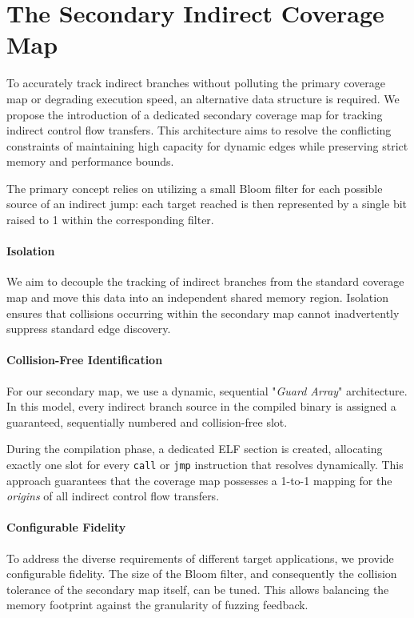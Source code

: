 \section{The Secondary Indirect Coverage Map}

To accurately track indirect branches without polluting the primary coverage map or degrading execution speed, an alternative data structure is required. We propose the introduction of a dedicated secondary coverage map for tracking indirect control flow transfers. This architecture aims to resolve the conflicting constraints of maintaining high capacity for dynamic edges while preserving strict memory and performance bounds.

The primary concept relies on utilizing a small Bloom filter for each possible source of an indirect jump: each target reached is then represented by a single bit raised to 1 within the corresponding filter. 

\paragraph{Isolation} We aim to decouple the tracking of indirect branches from the standard coverage map and move this data into an independent shared memory region. Isolation ensures that collisions occurring within the secondary map cannot inadvertently suppress standard edge discovery. 

\paragraph{Collision-Free Identification} For our secondary map, we use a dynamic, sequential "\textit{Guard Array}" architecture. In this model, every indirect branch source in the compiled binary is assigned a guaranteed, sequentially numbered and collision-free slot. 

During the compilation phase, a dedicated ELF section is created, allocating exactly one slot for every \texttt{call} or \texttt{jmp} instruction that resolves dynamically. This approach guarantees that the coverage map possesses a 1-to-1 mapping for the \textit{origins} of all indirect control flow transfers.

\paragraph{Configurable Fidelity} To address the diverse requirements of different target applications, we provide configurable fidelity. The size of the Bloom filter, and consequently the collision tolerance of the secondary map itself, can be tuned. This allows balancing the memory footprint against the granularity of fuzzing feedback.